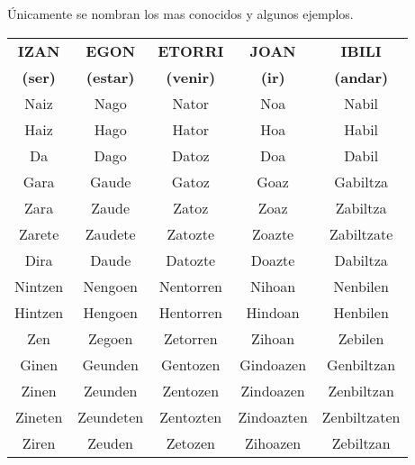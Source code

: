 \documentclass[11pt, a4paper]{article}
\begin{document}
Únicamente se nombran los mas conocidos y algunos ejemplos.
\newpage

\begin{table}[h]
	\centering
	\begin{tabular}{|c|c|c|c|c|}
		\hline
		\textbf{ IZAN }  & \textbf{ EGON }   & \textbf{ETORRI}   & \textbf{JOAN}  & \textbf{IBILI}    \\
		\textbf{ (ser) } & \textbf{(estar) } & \textbf{(venir) } & \textbf{(ir) } & \textbf{(andar) } \\ \hline\hline
		Naiz             & Nago              & Nator             & Noa            & Nabil             \\ \hline
		Haiz             & Hago              & Hator             & Hoa            & Habil             \\ \hline
		Da               & Dago              & Datoz             & Doa            & Dabil             \\ \hline
		Gara             & Gaude             & Gatoz             & Goaz           & Gabiltza          \\ \hline
		Zara             & Zaude             & Zatoz             & Zoaz           & Zabiltza          \\ \hline
		Zarete           & Zaudete           & Zatozte           & Zoazte         & Zabiltzate        \\ \hline
		Dira             & Daude             & Datozte           & Doazte         & Dabiltza          \\ \hline\hline
		Nintzen          & Nengoen           & Nentorren         & Nihoan         & Nenbilen          \\ \hline
		Hintzen          & Hengoen           & Hentorren         & Hindoan        & Henbilen          \\ \hline
		Zen              & Zegoen            & Zetorren          & Zihoan         & Zebilen           \\ \hline
		Ginen            & Geunden           & Gentozen          & Gindoazen      & Genbiltzan        \\ \hline
		Zinen            & Zeunden           & Zentozen          & Zindoazen      & Zenbiltzan        \\ \hline
		Zineten          & Zeundeten         & Zentozten         & Zindoazten     & Zenbiltzaten      \\ \hline
		Ziren            & Zeuden            & Zetozen           & Zihoazen       & Zebiltzan         \\ \hline
	\end{tabular}
\end{table}
\end{document}
